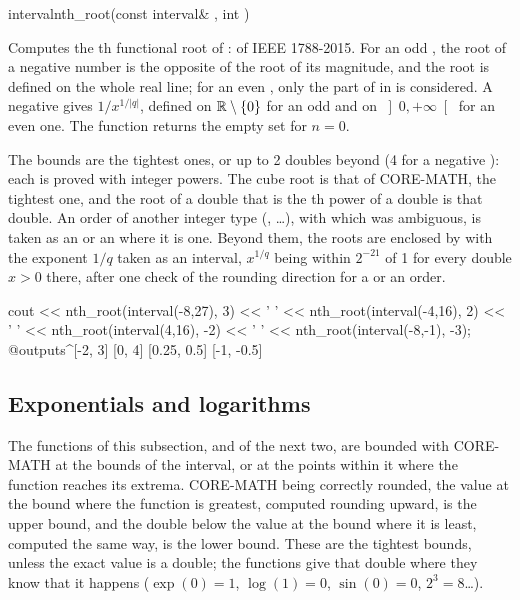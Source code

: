 \begin{deffun}{interval}{nth\_root}{(const interval\& , int )}
  \begin{operation}
  \end{operation}
  Computes the th functional root of :  of
  IEEE 1788-2015. For an odd , the root of a negative number is the
  opposite of the root of its magnitude, and the root is defined on the whole
  real line; for an even , only the part of  in
   is considered.\newinvfive{} A negative  gives
  $1/x^{1/|q|}$, defined on $\mathbb{R}\setminus\{0\}$ for an odd  and on
  $\left]0,+\infty\right[$ for an even one. The function returns the empty
  set for $n=0$.

  The bounds are the tightest ones, or up to 2 doubles beyond (4 for a
  negative ): each is proved with integer powers. The cube root is
  that of CORE-MATH, the tightest one, and the root of a double that is the
  th power of a double is that double. An order of another integer
  type (, \dots), with which  was
  ambiguous, is taken as an  or an  where it is
  one. Beyond them, the roots are enclosed by  with the exponent
  $1/q$ taken as an interval, $x^{1/q}$ being within $2^{-21}$ of 1 for every
  double $x>0$ there, after one check of the rounding direction for a
   or an  order.\newinvfive
\begin{example}
cout << nth_root(interval(-8,27), 3) << ' '
     << nth_root(interval(-4,16), 2) << ' '
     << nth_root(interval(4,16), -2) << ' '
     << nth_root(interval(-8,-1), -3);
@outputs^[-2, 3] [0, 4] [0.25, 0.5] [-1, -0.5]~
\end{example}
\end{deffun}

\subsection{Exponentials and logarithms}\label{sec:arithmetic-exp-log}
%

The functions of this subsection, and of the next two, are bounded with
CORE-MATH at the bounds of the interval, or at the points within it where
the function reaches its extrema. CORE-MATH being correctly rounded, the
value at the bound where the function is greatest, computed rounding upward, is
the upper bound, and the double below the value at the bound where it is least,
computed the same way, is the lower bound. These are the tightest bounds, unless the
exact value is a double; the functions give that double where they know that
it happens ($\exp(0)=1$, $\log(1)=0$, $\sin(0)=0$, $2^3=8$\ldots).\newinvfive
{}%

